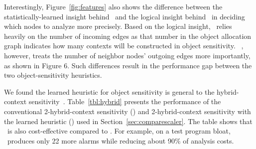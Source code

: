 Interestingly, Figure~\ref{fig:features} also shows the difference between the statistically-learned insight behind \OurCtx~and the logical insight behind \Scaler~in deciding which nodes to analyze more precisely.
Based on the logical insight, \Scaler~relies heavily on the number of incoming edges
as that number in the object allocation graph indicates %
how many contexts will be constructed in object sensitivity.%
~\ourtool, however, treats the number of neighbor nodes' outgoing edges more importantly, as shown in Figure 6.
Such differences result in the performance gap between the two object-sensitivity heuristics.

We found the learned heuristic for object sensitivity is general to the hybrid-context sensitivity~\cite{KastrinisS13a}. Table~\ref{tbl:hybrid} presents the performance of the conventional 2-hybrid-context sensitivity (\twosobjH) and
2-hybrid-context sensitivity with the learned heuristic (\ourtool) used in Section~\ref{sec:comparescaler}.
The table shows that \ourtool~is also cost-effective compared to \twosobjH. For example, on a test program bloat,
\ourtool~produces only 22 more alarms while reducing about 90\% of analysis costs.



